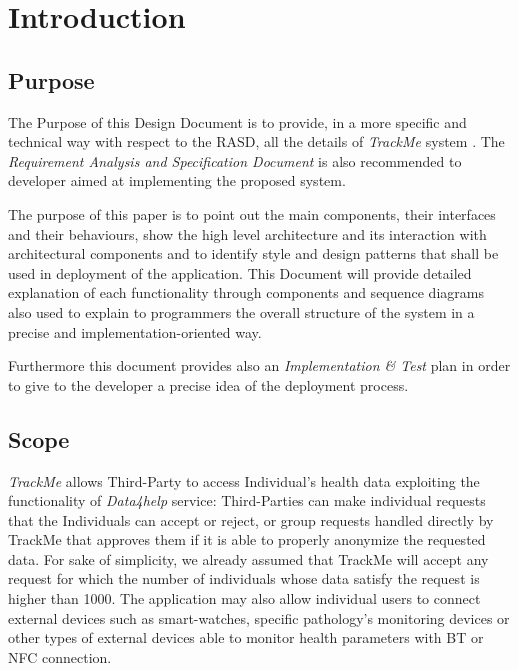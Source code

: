 \documentclass[a4paper]{article}
\begin{document}

\tableofcontents
{}

\newpage
\pagestyle{fancy}

\section{Introduction}
\subsection{Purpose}
    The Purpose of this Design Document is to provide, in a more specific and technical way with respect to the RASD, all the details of \textit{TrackMe} system \cite{rasd}. The \textit{Requirement Analysis and Specification Document} is also recommended to developer aimed at implementing the proposed system.
    
    The purpose of this paper is to point out the main components, their interfaces and their behaviours, show the high level architecture and its interaction with architectural components and to identify style and design patterns that shall be used in deployment of the application. This Document will provide detailed explanation of each functionality through components and sequence diagrams also used to explain to programmers the overall structure of the system in a precise and implementation-oriented way.
    
    Furthermore this document provides also an \textit{Implementation \& Test} plan in order to give to the developer a precise idea of the deployment process.
 
\subsection{Scope}
    \textit{TrackMe} allows Third-Party to access Individual's health data exploiting the functionality of \textit{Data4help} service: Third-Parties can make individual requests that the Individuals can accept or reject, or group requests handled directly by TrackMe that approves them if it is able to properly anonymize the requested data. For sake of simplicity, we already assumed that TrackMe will accept any request for which the number of individuals whose data satisfy the request is higher than 1000. The application may also allow individual users to connect external devices such as smart-watches, specific pathology's monitoring devices or other types of external devices able to monitor health parameters with BT or NFC connection.
\end{document}
